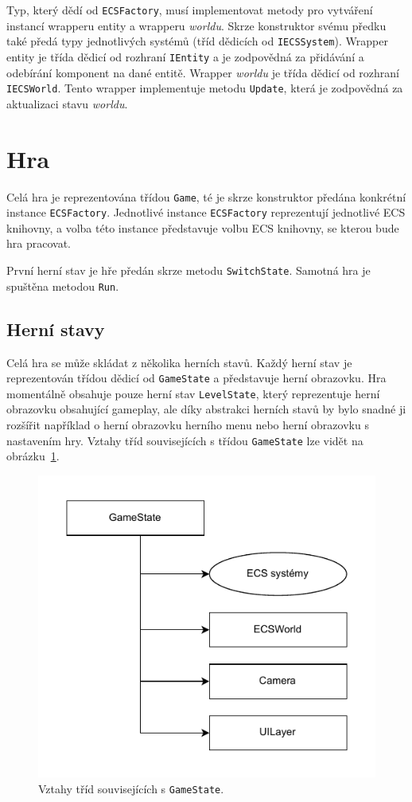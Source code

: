 Typ, který dědí od \texttt{ECSFactory}, musí implementovat metody pro vytváření instancí wrapperu entity a wrapperu \textit{worldu}. Skrze konstruktor svému předku také předá typy jednotlivých systémů (tříd dědicích od \texttt{IECSSystem}). Wrapper entity je třída dědicí od rozhraní \texttt{IEntity} a je zodpovědná za přidávání a odebírání komponent na dané entitě. Wrapper \textit{worldu} je třída dědicí od rozhraní \texttt{IECSWorld}. Tento wrapper implementuje metodu \texttt{Update}, která je zodpovědná za aktualizaci stavu \textit{worldu}.

\section{Hra}
\label{sec:game-impl}
Celá hra je reprezentována třídou \texttt{Game}, té je skrze konstruktor předána konkrétní instance \texttt{ECSFactory}. Jednotlivé instance \texttt{ECSFactory} reprezentují jednotlivé ECS knihovny, a volba této instance představuje volbu ECS knihovny, se kterou bude hra pracovat.

První herní stav je hře předán skrze metodu \texttt{SwitchState}. Samotná hra je spuštěna metodou \texttt{Run}.

\subsection{Herní stavy}
Celá hra se může skládat z několika herních stavů. Každý herní stav je reprezentován třídou dědicí od \texttt{GameState} a představuje herní obrazovku. Hra momentálně obsahuje pouze herní stav \texttt{LevelState}, který reprezentuje herní obrazovku obsahující gameplay, ale díky abstrakci herních stavů by bylo snadné ji rozšířit například o herní obrazovku herního menu nebo herní obrazovku s nastavením hry. Vztahy tříd souvisejících s třídou \texttt{GameState} lze vidět na obrázku~\ref{fig:game-state}.

\begin{figure}[!htb]
  \centering
  \includegraphics[width=0.5\linewidth]{img/game-state.pdf}
  \caption{Vztahy tříd souvisejících s \texttt{GameState}.}
  \label{fig:game-state}
\end{figure}

